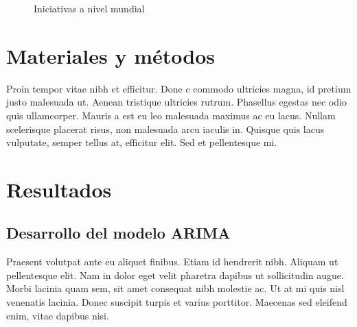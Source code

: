 \documentclass[artMGITG,SIG,accept,moreauthors,font4]{mgitg}
\begin{document}
\begin{figure}[!ht]
    \centering
    \hfill
    \caption{Iniciativas a nivel mundial}
    \label{fig3}
\end{figure}


\section{Materiales y métodos}
%
\noindent
Proin tempor vitae nibh et efficitur. Done c commodo ultricies magna, id pretium justo malesuada ut. Aenean tristique ultricies rutrum. Phasellus egestas nec odio quis ullamcorper. Mauris a est eu leo malesuada maximus ac eu lacus. Nullam scelerisque placerat risus, non malesuada arcu iaculis in. Quisque quis lacus vulputate, semper tellus at, efficitur elit. Sed et pellentesque mi.

\section{Resultados}
%
\unskip
\subsection{Desarrollo del modelo ARIMA} 
%
\noindent
Praesent volutpat ante eu aliquet finibus. Etiam id hendrerit nibh. Aliquam ut pellentesque elit. Nam in dolor eget velit pharetra dapibus ut sollicitudin augue. Morbi lacinia quam sem, sit amet consequat nibh molestie ac. Ut at mi quis nisl venenatis lacinia. Donec suscipit turpis et varius porttitor. Maecenas sed eleifend enim, vitae dapibus nisi.
\end{document}
